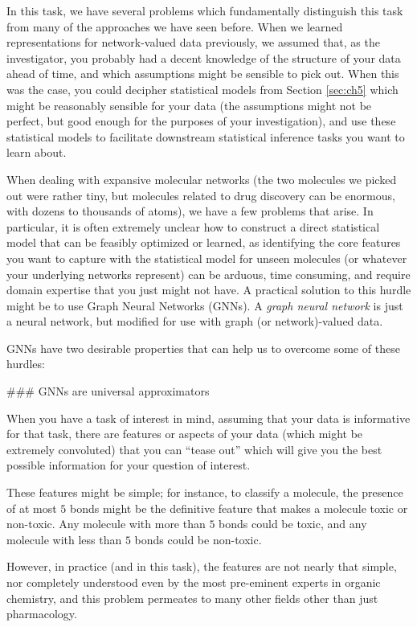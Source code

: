 In this task, we have several problems which fundamentally distinguish this task from many of the approaches we have seen before. When we learned representations for network-valued data previously, we assumed that, as the investigator, you probably had a decent knowledge of the structure of your data ahead of time, and which assumptions might be sensible to pick out. When this was the case, you could decipher statistical models from Section \ref{sec:ch5} which might be reasonably sensible for your data (the assumptions might not be perfect, but good enough for the purposes of your investigation), and use these statistical models to facilitate downstream statistical inference tasks you want to learn about. 

When dealing with expansive molecular networks (the two molecules we picked out were rather tiny, but molecules related to drug discovery can be enormous, with dozens to thousands of atoms), we have a few problems that arise. In particular, it is often extremely unclear how to construct a direct statistical model that can be feasibly optimized or learned, as identifying the core features you want to capture with the statistical model for unseen molecules (or whatever your underlying networks represent) can be arduous, time consuming, and require domain expertise that you just might not have. A practical solution to this hurdle might be to use Graph Neural Networks (GNNs). A \textit{graph neural network} is just a neural network, but modified for use with graph (or network)-valued data.

GNNs have two desirable properties that can help us to overcome some of these hurdles:

### GNNs are universal approximators

When you have a task of interest in mind, assuming that your data is informative for that task, there are features or aspects of your data (which might be extremely convoluted) that you can ``tease out'' which will give you the best possible information for your question of interest. 

These features might be simple; for instance, to classify a molecule, the presence of at most $5$ bonds might be the definitive feature that makes a molecule toxic or non-toxic. Any molecule with more than $5$ bonds could be toxic, and any molecule with less than $5$ bonds could be non-toxic.

However, in practice (and in this task), the features are not nearly that simple, nor completely understood even by the most pre-eminent experts in organic chemistry, and this problem permeates to many other fields other than just pharmacology. 

